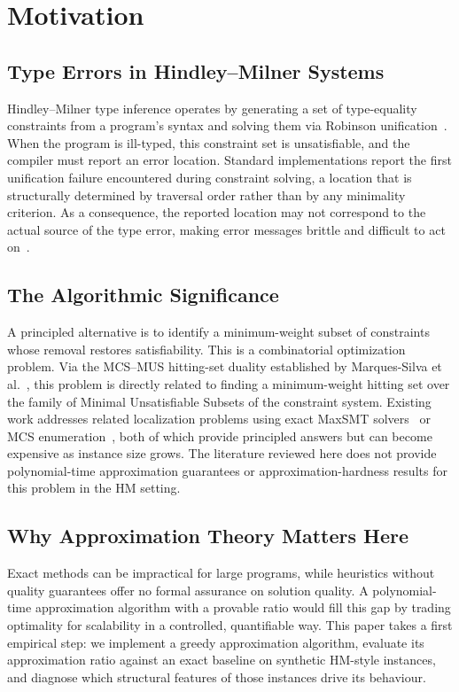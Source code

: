 \section{Motivation}

\subsection{Type Errors in Hindley--Milner Systems}

Hindley--Milner type inference operates by generating a set of type-equality
constraints from a program's syntax and solving them via Robinson unification~\cite{damas1982}.
When the program is ill-typed, this constraint set is unsatisfiable, and the compiler
must report an error location.
Standard implementations report the first unification failure encountered during
constraint solving, a location that is structurally determined by traversal order
rather than by any minimality criterion.
As a consequence, the reported location may not correspond to the actual source of the
type error, making error messages brittle and difficult to act on~\cite{pavlinovic2014}.

\subsection{The Algorithmic Significance}

A principled alternative is to identify a minimum-weight subset of constraints whose
removal restores satisfiability.
This is a combinatorial optimization problem.
Via the MCS--MUS hitting-set duality established by Marques-Silva et al.~\cite{marques-silva2013},
this problem is directly related to finding a minimum-weight hitting set over the family
of Minimal Unsatisfiable Subsets of the constraint system.
Existing work addresses related localization problems using exact MaxSMT solvers~\cite{pavlinovic2014,kopinsky2024}
or MCS enumeration~\cite{fu2024}, both of which provide principled answers but can become
expensive as instance size grows.
The literature reviewed here does not provide polynomial-time approximation guarantees
or approximation-hardness results for this problem in the HM setting.

\subsection{Why Approximation Theory Matters Here}

Exact methods can be impractical for large programs, while heuristics without quality
guarantees offer no formal assurance on solution quality.
A polynomial-time approximation algorithm with a provable ratio would fill this gap by
trading optimality for scalability in a controlled, quantifiable way.
This paper takes a first empirical step: we implement a greedy approximation algorithm,
evaluate its approximation ratio against an exact baseline on synthetic HM-style
instances, and diagnose which structural features of those instances drive its behaviour.
